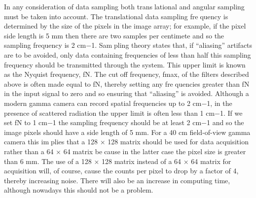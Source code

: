 \documentclass[12pt]{article}
\begin{document}
 In any consideration of data sampling both translational and angular sampling must be taken into account. The translational data sampling frequency is determined by the size of the pixels in the image array; for example, if the pixel side length is 5 mm then there are two samples per centimete and so the sampling frequency is 2 cm−1. Sampling theory states that, if “aliasing” artifacts are to be avoided, only data containing frequencies of less than half this sampling frequency should be transmitted through the system. This upper limit is known as the Nyquist frequency, fN. The cutoff frequency, fmax, of the filters described above is often made equal to fN, thereby setting any frequencies greater than fN in the input signal to zero and so ensuring that “aliasing” is avoided.
Although a modern gamma camera can record spatial frequencies up to 2 cm−1, in the presence of scattered radiation the upper limit is often less
than 1 cm−1. If we set fN to 1 cm−1 the sampling frequency should be at least 2 cm−1 and so the image pixels should have a side length of 5 mm.
For a 40 cm field-of-view gamma camera this implies that a 128 × 128 matrix should be used for data acquisition rather than a 64 × 64 matrix because in the latter case the pixel size is greater than 6 mm. The use of a 128 × 128 matrix instead of a 64 × 64 matrix for acquisition will, of course, cause the counts per pixel to drop by a factor of 4, thereby increasing noise. There will also be an increase in computing time, although nowadays this should not be a problem.
\end{document}
